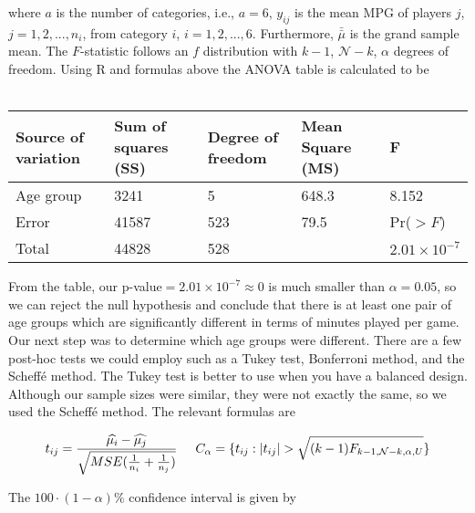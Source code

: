 \documentclass{article}
\begin{document}
where $a$ is the number of categories, i.e., $a=6$, $y_{ij}$ is the mean MPG of players $j$, $j=1,2,...,n_i$, from category $i$, $i=1,2,...,6$. Furthermore, $\bar{\bar{\mu}}$ is the grand sample mean. The $F$-statistic follows an $f$ distribution with $k-1$, $\mathcal{N}-k$, $\alpha$ degrees of freedom. Using R and formulas above the ANOVA table is calculated to be \\\\

\begin{center}
\begin{tabular}{ p{2cm}|p{2cm}|p{2cm}|p{2cm}|p{2cm} }
 \hline
 Source of variation & Sum of squares (SS) &Degree of freedom & Mean Square (MS) & F \\
\hline 
\vspace{0.00025cm} Age group & 3241 & 5 &  648.3 &  8.152 \\ [2ex]
\hline
\vspace{0.00025cm} Error & 41587 & 523 & 79.5 & Pr($>F$) \\[2ex]

\hline
\vspace{0.00025cm} Total & 44828  & 528& &\vspace{0.00025cm} $2.01 \times 10^{-7}$\\[2ex]
\hline

\end{tabular}
\end{center}
\vspace{0.75cm}

From the table, our p-value$=2.01\times 10^{-7}\approx 0$ is much smaller than $\alpha=0.05$, so we can reject the null hypothesis and conclude that there is at least one pair of age groups which are significantly different in terms of minutes played per game. Our next step was to determine which age groups were different. There are a few post-hoc tests we could employ such as a Tukey test, Bonferroni method, and the Scheffé method. The Tukey test is better to use when you have a balanced design. Although our sample sizes were similar, they were not exactly the same, so we used the Scheffé method. The relevant formulas are

$$t_{ij}=\frac{\widehat{\mu_i}-\widehat{\mu_j}}{\sqrt{MSE(\frac{1}{n_i}+\frac{1}{n_j})}} \hspace{0.5cm} C_{\alpha}=\{t_{ij} : |t_{ij}|> \sqrt{(k-1) F_{k-1,\mathcal{N}-k,\alpha, U}} \}$$  

The $100\cdot (1-\alpha)\%$ confidence interval is given by 
\end{document}
